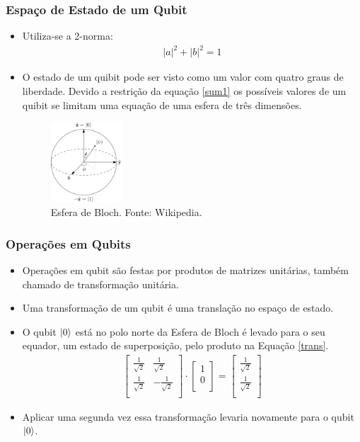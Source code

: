 \documentclass{beamer}
\DeclarePairedDelimiter\ket{\lvert}{\rangle}
\begin{document}
\begin{frame}
\frametitle{Espaço de Estado de um Qubit}
\begin{itemize}
\item Utiliza-se a 2-norma:
  \begin{align}
    \label{sum1}
      |a|^2 + |b|^2 = 1
  \end{align}
\item O estado de um quibit pode ser visto como um valor com quatro graus de
liberdade. Devido a restrição da equação \ref{sum1} os possíveis valores de um
quibit se limitam uma equação de uma esfera de três dimensões.
\begin{figure}[h]
\label{bloch}
\centering
\includegraphics[width=0.25\textwidth]{bloch.png}
\caption{Esfera de Bloch. Fonte: Wikipedia.}
\end{figure}
\end{itemize}
\end{frame}

\begin{frame}
\frametitle{Operações em Qubits}
\begin{itemize}
  \item Operações em qubit são festas por produtos de matrizes unitárias, também chamado
  de transformação unitária.
  \item Uma transformação de um qubit é uma translação no espaço de estado.
  \item O qubit $\ket{0}$ está no polo norte da Esfera de Bloch é
    levado para o seu equador, um estado de superposição, pelo produto
    na Equação \ref{trans}.
       \begin{align}
         \label{trans}
       \begin{bmatrix} 
                 \frac{1}{\sqrt{2}} & \frac{1}{\sqrt{2}}\\ 
                 \frac{1}{\sqrt{2}} & -\frac{1}{\sqrt{2}}\\ 
       \end{bmatrix}
         \cdot
       \begin{bmatrix} 
                 1 \\ 
                 0 \\ 
       \end{bmatrix}
         =
       \begin{bmatrix} 
                \frac{1}{\sqrt{2}} \\ 
                \frac{1}{\sqrt{2}} \\ 
       \end{bmatrix}
       \end{align}
  \item Aplicar uma segunda vez essa transformação levaria novamente para o qubit $\ket{0}$.
\end{itemize}
\end{frame}
\end{document}
